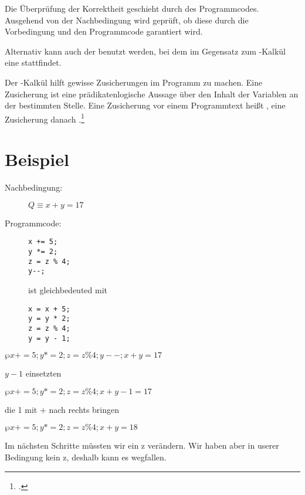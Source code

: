 \documentclass{lehramt-informatik-haupt}
\begin{document}
Die Überprüfung der Korrektheit geschieht durch 
des Programmcodes. Ausgehend von der Nachbedingung wird geprüft, ob
diese durch die Vorbedingung und den Programmcode garantiert wird.

Alternativ kann auch der  benutzt werden, bei dem im
Gegensatz zum -Kalkül eine  stattfindet.

Der -Kalkül hilft gewisse Zusicherungen im Programm zu machen.
Eine Zusicherung ist eine prädikatenlogische Aussage über den Inhalt der
Variablen an der bestimmten Stelle. Eine Zusicherung vor einem
Programmtext heißt , eine Zusicherung danach
.\footcite{wiki:wp-kalkuel}

%

\section{Beispiel}


\begin{description}
\item[Nachbedingung:] $Q \equiv x + y = 17$

\item[Programmcode:]

\begin{verbatim}
x += 5;
y *= 2;
z = z % 4;
y--;
\end{verbatim}

ist gleichbedeuted mit

\begin{verbatim}
x = x + 5;
y = y * 2;
z = z % 4;
y = y - 1;
\end{verbatim}
\end{description}

\noindent
$\wp{x += 5; y *= 2; z = z \% 4; y--;}{x + y = 17}$

\noindent
$y - 1$ einsetzten

\noindent
$\wp{x += 5; y *= 2; z = z \% 4;}{x + y - 1 = 17}$

\noindent
die 1 mit $+$ nach rechts bringen

$\wp{x += 5; y *= 2; z = z \% 4;}{x + y = 18}$

Im nächsten Schritte müssten wir ein z verändern. Wir haben aber in
userer Bedingung kein z, deshalb kann es wegfallen.
\end{document}
